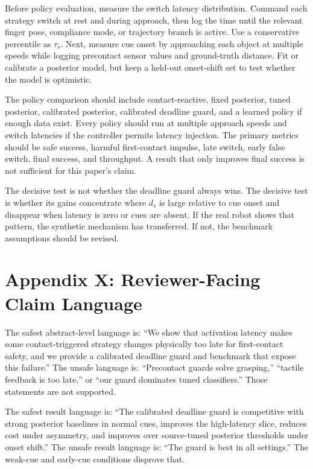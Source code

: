 \documentclass{article}
\begin{document}
Before policy evaluation, measure the switch latency distribution. Command each strategy switch at rest and during approach, then log the time until the relevant finger pose, compliance mode, or trajectory branch is active. Use a conservative percentile as $\tau_s$. Next, measure cue onset by approaching each object at multiple speeds while logging precontact sensor values and ground-truth distance. Fit or calibrate a posterior model, but keep a held-out onset-shift set to test whether the model is optimistic.

The policy comparison should include contact-reactive, fixed posterior, tuned posterior, calibrated posterior, calibrated deadline guard, and a learned policy if enough data exist. Every policy should run at multiple approach speeds and switch latencies if the controller permits latency injection. The primary metrics should be safe success, harmful first-contact impulse, late switch, early false switch, final success, and throughput. A result that only improves final success is not sufficient for this paper's claim.

The decisive test is not whether the deadline guard always wins. The decisive test is whether its gains concentrate where $d_s$ is large relative to cue onset and disappear when latency is zero or cues are absent. If the real robot shows that pattern, the synthetic mechanism has transferred. If not, the benchmark assumptions should be revised.

\section{Appendix X: Reviewer-Facing Claim Language}

The safest abstract-level language is: ``We show that activation latency makes some contact-triggered strategy changes physically too late for first-contact safety, and we provide a calibrated deadline guard and benchmark that expose this failure.'' The unsafe language is: ``Precontact guards solve grasping,'' ``tactile feedback is too late,'' or ``our guard dominates tuned classifiers.'' Those statements are not supported.

The safest result language is: ``The calibrated deadline guard is competitive with strong posterior baselines in normal cues, improves the high-latency slice, reduces cost under asymmetry, and improves over source-tuned posterior thresholds under onset shift.'' The unsafe result language is: ``The guard is best in all settings.'' The weak-cue and early-cue conditions disprove that.
\end{document}
